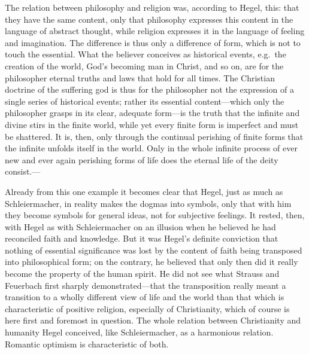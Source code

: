 \documentclass[12pt,a4paper]{book}
\newcommand{\opage}[1]{\marginnote{\footnotesize\textit{[#1]}}}
\begin{document}
The relation between philosophy and religion was, according to Hegel,
this: that they have the same content, only that
\opage{12}philosophy expresses this content in the language of abstract thought,
while religion expresses it in the language of feeling and imagination.
The difference is thus only a difference of form, which is not to touch
the essential.
What the believer conceives as historical events, e.g.\ the creation of
the world, God's becoming man in Christ, and so on, are for the
philosopher eternal truths and laws that hold for all times. The
Christian doctrine of the suffering god is thus for the philosopher not
the expression of a single series of historical events; rather its
essential content---which only the philosopher grasps in its clear,
adequate form---is the truth that the infinite and divine stirs in the
finite world, while yet every finite form is imperfect and must be
shattered. It is, then, only through the continual perishing of finite
forms that the infinite unfolds itself in the world. Only in the whole
infinite process of ever new and ever again perishing forms of life does
the eternal life of the deity consist.---

Already from this one example it becomes clear that Hegel, just as much
as Schleiermacher, in reality makes the dogmas into symbols, only that
with him they become symbols for general ideas, not for subjective
feelings. It rested, then, with Hegel as with Schleiermacher on an
illusion when he believed he had reconciled faith and knowledge. But it
was Hegel's definite conviction that nothing of essential significance
was lost by the content of faith being transposed into philosophical
form; on the contrary, he believed that only then did it really become
the property of the human spirit. He did not see what Strauss and
Feuerbach first sharply demonstrated---that the transposition really
meant a transition to a wholly different view of life and the world than
that which is characteristic of positive religion, especially of
Christianity, which of course is here first and
\opage{13}foremost in question. The whole relation between Christianity and
humanity Hegel conceived, like Schleiermacher, as a harmonious relation.
Romantic optimism is characteristic of both.
\end{document}
